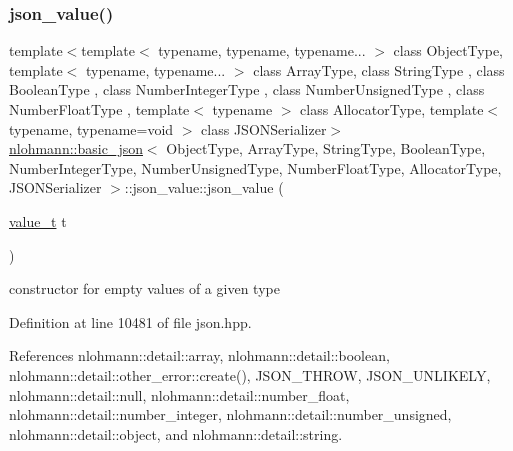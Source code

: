 \subsubsection{\texorpdfstring{json\+\_\+value()}{json\_value()}\hspace{0.1cm}{\footnotesize\ttfamily [6/12]}}
{\footnotesize\ttfamily template$<$template$<$ typename, typename, typename... $>$ class Object\+Type, template$<$ typename, typename... $>$ class Array\+Type, class String\+Type , class Boolean\+Type , class Number\+Integer\+Type , class Number\+Unsigned\+Type , class Number\+Float\+Type , template$<$ typename $>$ class Allocator\+Type, template$<$ typename, typename=void $>$ class J\+S\+O\+N\+Serializer$>$ \\
\hyperlink{classnlohmann_1_1basic__json}{nlohmann\+::basic\+\_\+json}$<$ Object\+Type, Array\+Type, String\+Type, Boolean\+Type, Number\+Integer\+Type, Number\+Unsigned\+Type, Number\+Float\+Type, Allocator\+Type, J\+S\+O\+N\+Serializer $>$\+::json\+\_\+value\+::json\+\_\+value (\begin{DoxyParamCaption}\item[{\hyperlink{namespacenlohmann_1_1detail_a1ed8fc6239da25abcaf681d30ace4985}{value\+\_\+t}}]{t }\end{DoxyParamCaption})\hspace{0.3cm}{\ttfamily [inline]}}



constructor for empty values of a given type 



Definition at line 10481 of file json.\+hpp.



References nlohmann\+::detail\+::array, nlohmann\+::detail\+::boolean, nlohmann\+::detail\+::other\+\_\+error\+::create(), J\+S\+O\+N\+\_\+\+T\+H\+R\+OW, J\+S\+O\+N\+\_\+\+U\+N\+L\+I\+K\+E\+LY, nlohmann\+::detail\+::null, nlohmann\+::detail\+::number\+\_\+float, nlohmann\+::detail\+::number\+\_\+integer, nlohmann\+::detail\+::number\+\_\+unsigned, nlohmann\+::detail\+::object, and nlohmann\+::detail\+::string.


